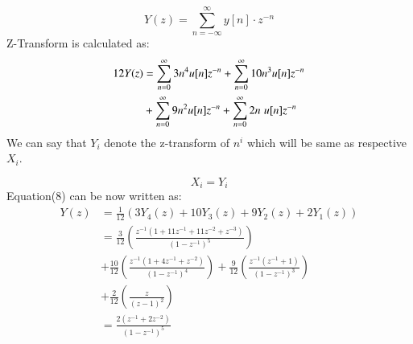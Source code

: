 \documentclass[journal,12pt,twocolumn]{IEEEtran}
\theoremstyle{remark}
\begin{document}
\begin{enumerate}[label=\alph*)]
\begin{equation}
    Y(z) = \sum_{n=-\infty}^\infty y[n]\cdot z^{-n}
\end{equation}
Z-Transform is calculated as:
\begin{align}
    12Y(z) &= \sum_{n=0}^\infty 3n^4u[n]z^{-n} +  \sum_{n=0}^\infty 10n^3u[n]z^{-n}\\ &+  \sum_{n=0}^\infty 9n^2u[n] z^{-n} +\sum_{n=0}^\infty 2n\hspace{3pt}u[n]z^{-n}\notag
\end{align}
We can say that $Y_i$ denote the z-transform of $n^{i}$ which will be same as respective $X_i$.

$$X_i=Y_i$$
\newpage
Equation(8) can be now written as:
\begin{align*}
    Y(z) &=\frac{1}{12}(3Y_4(z) + 10Y_3(z) + 9Y_2(z) + 2Y_1(z)) \\
         &= \frac{3}{12}\left(\frac{z^{-1}(1+11z^{-1}+11z^{-2}+z^{-3})}{(1-z^{-1})^5}\right)\\ &+ \frac{10}{12}\left(\frac{z^{-1}(1+4z^{-1}+z^{-2})}{(1-z^{-1})^4}\right) 
         + \frac{9}{12}\left(\frac{z^{-1}(z^{-1}+1)}{(1-z^{-1})^3}\right)\\ &+ \frac{2}{12}\left(\frac{z}{(z - 1)^2}\right) \\
         &= \frac{2(z^{-1}+2z^{-2})}{(1-z^{-1})^5}
\end{align*}
\end{enumerate}
\end{document}
